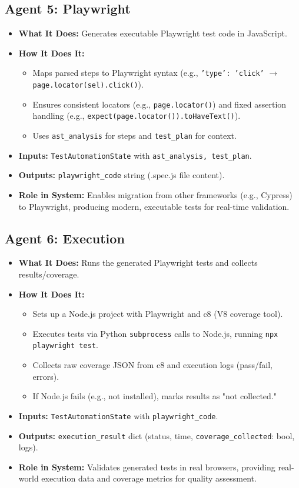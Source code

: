 \documentclass{article}
\begin{document}
\subsection{Agent 5: Playwright}
\begin{itemize}
    \item \textbf{What It Does:} Generates executable Playwright test code in JavaScript.
    \item \textbf{How It Does It:} 
        \begin{itemize}
            \item Maps parsed steps to Playwright syntax (e.g., \texttt{'type': 'click'} $\rightarrow$ \texttt{page.locator(sel).click()}).
            \item Ensures consistent locators (e.g., \texttt{page.locator()}) and fixed assertion handling (e.g., \texttt{expect(page.locator()).toHaveText()}).
            \item Uses \texttt{ast\_analysis} for steps and \texttt{test\_plan} for context.
        \end{itemize}
    \item \textbf{Inputs:} \texttt{TestAutomationState} with \texttt{ast\_analysis, test\_plan}.
    \item \textbf{Outputs:} \texttt{playwright\_code} string (.spec.js file content).
    \item \textbf{Role in System:} Enables migration from other frameworks (e.g., Cypress) to Playwright, producing modern, executable tests for real-time validation.
\end{itemize}

\subsection{Agent 6: Execution}
\begin{itemize}
    \item \textbf{What It Does:} Runs the generated Playwright tests and collects results/coverage.
    \item \textbf{How It Does It:} 
        \begin{itemize}
            \item Sets up a Node.js project with Playwright and c8 (V8 coverage tool).
            \item Executes tests via Python \texttt{subprocess} calls to Node.js, running \texttt{npx playwright test}.
            \item Collects raw coverage JSON from c8 and execution logs (pass/fail, errors).
            \item If Node.js fails (e.g., not installed), marks results as "not collected."
        \end{itemize}
    \item \textbf{Inputs:} \texttt{TestAutomationState} with \texttt{playwright\_code}.
    \item \textbf{Outputs:} \texttt{execution\_result} dict (status, time, \texttt{coverage\_collected}: bool, logs).
    \item \textbf{Role in System:} Validates generated tests in real browsers, providing real-world execution data and coverage metrics for quality assessment.
\end{itemize}
\end{document}
